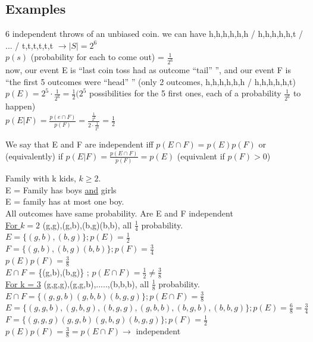 \documentclass[12pt,a4paper]{article}
\begin{document}
\subsection{Examples}
6 independent throws of an unbiased coin. we can have h,h,h,h,h,h / h,h,h,h,h,t / ... / t,t,t,t,t,t $\to |S| = 2^6$\\
$p(s)$ (probability for each to come out) = $\frac{1}{2^6}$\\
now, our event E is ``last coin toss had as outcome ``tail'' '', and our event F is ``the first 5 outcomes were ``head'' '' (only 2 outcomes, h,h,h,h,h,h / h,h,h,h,h,t)\\
$p(E) = 2^5 \cdot \frac{1}{2^6} = \frac{1}{2} (2^5$ possibilities for the 5 first ones, each of a probability $\frac{1}{2^6}$ to happen)\\
$p(E|F) = \frac{p(e\cap F)}{p(F)} = \frac{\frac{1}{2^6}}{2\cdot \frac{1}{2^6}} = \frac{1}{2}$
\begin{boite}
	We say that E and F are independent iff $p(E\cap F) = p(E)p(F)$ or (equivalently) if $p(E|F) = \frac{p(E\cap F)}{p(F)} = p(E)$ (equivalent if $p(F) > 0$)
\end{boite}
 Family with k kids, $k \geq 2$.\\
E = Family has boys \underline{and} girls\\
E = family has at most one boy.\\
All outcomes have same probability. Are E and F independent
\\
\underline{For $k = 2$} (g,g),(g,b),(b,g)(b,b), all $\frac{1}{4}$ probability.\\
$E = \{(g,b),(b,g)\} ; p(E) = \frac{1}{2}$\\
$F = \{(g,b),(b,g)(b,b)\} ; p(F) = \frac{3}{4}$\\
$p(E)p(F) = \frac{3}{8}$\\
$E \cap F$ = \{(g,b),(b,g)\} ; $p(E\cap F) = \frac{1}{2} \neq \frac{3}{8}$\\
\underline{For k = 3} (g,g,g),(g,g,b),.....,(b,b,b), all $\frac{1}{8}$ probability.\\
$E\cap F = \{(g,g,b)(g,b,b)(b,g,g)\} ; p(E\cap F) = \frac{3}{8}$\\
$E = \{(g,g,b),(g,b,g),(b,g,g),(g,b,b),(b,g,b),(b,b,g)\} ; p(E) = \frac{6}{8} = \frac{3}{4}$\\
$F = \{(g,g,g)(g,g,b)(g,b,g)(b,g,g)\} ; p(F) = \frac{1}{2}$\\
$p(E)p(F) = \frac{3}{8} =p(E\cap F) \to$ independent
\end{document}
